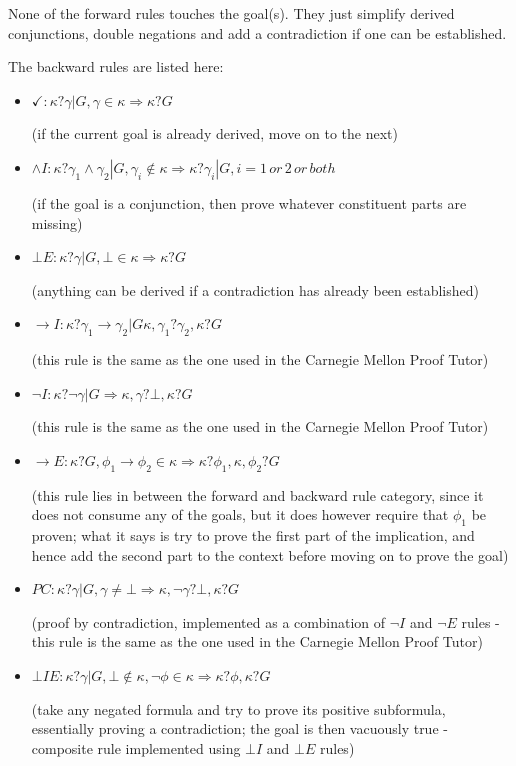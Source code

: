 \documentclass[11pt,twoside,a4paper]{report}
\begin{document}
None of the forward rules touches the goal(s). They just simplify derived conjunctions, double negations and add a contradiction if one can be established.

The backward rules are listed here:

\begin{itemize}
\item
$\checkmark: \kappa?\gamma|G, \gamma\in\kappa \Rightarrow \kappa?G$

(if the current goal is already derived, move on to the next)
\item
$\wedge I: \kappa?\gamma_1\wedge\gamma_2|G, \gamma_i\notin\kappa \Rightarrow \kappa?\gamma_i|G, i = 1\, or\, 2\, or\, both$

(if the goal is a conjunction, then prove whatever constituent parts are missing)
\item
$\bot E: \kappa?\gamma|G, \bot\in\kappa \Rightarrow \kappa?G$

(anything can be derived if a contradiction has already been established)
\item
$\rightarrow I: \kappa?\gamma_1\rightarrow\gamma_2|G \kappa,\gamma_1?\gamma_2, \kappa?G$

(this rule is the same as the one used in the Carnegie Mellon Proof Tutor)
\item
$\neg I: \kappa?\neg\gamma|G \Rightarrow \kappa,\gamma?\bot, \kappa?G$

(this rule is the same as the one used in the Carnegie Mellon Proof Tutor)
\item
$\rightarrow E: \kappa?G, \phi_1\rightarrow\phi_2\in\kappa \Rightarrow \kappa?\phi_1, \kappa,\phi_2?G$

(this rule lies in between the forward and backward rule category, since it does not consume any of the goals, but it does however require that $\phi_1$ be proven; what it says is try to prove the first part of the implication, and hence add the second part to the context before moving on to prove the goal)
\item
$PC: \kappa?\gamma|G, \gamma\neq\bot \Rightarrow \kappa,\neg\gamma?\bot, \kappa?G$

(proof by contradiction, implemented as a combination of $\neg I$ and $\neg E$ rules - this rule is the same as the one used in the Carnegie Mellon Proof Tutor)

\item
$\bot IE: \kappa?\gamma|G, \bot\notin\kappa, \neg\phi\in\kappa \Rightarrow \kappa?\phi, \kappa?G$

(take any negated formula and try to prove its positive subformula, essentially proving a contradiction; the goal is then vacuously true - composite rule implemented using $\bot I$ and $\bot E$ rules)
\end{itemize}
\end{document}
